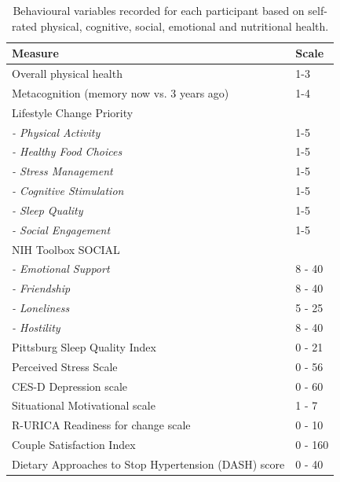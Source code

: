 \begin{table}[h]
\centering
\caption{Behavioural variables recorded for each participant based on self-rated physical, cognitive, social, emotional and nutritional health.}
\label{tbl: behavioural-variables}
\begin{tabular}{@{}ll@{}}
\toprule
Measure & Scale \\ \midrule
Overall physical health & 1-3 \\
Metacognition (memory now vs. 3 years ago) & 1-4 \\
Lifestyle Change Priority & \\
\textit{- Physical Activity} & 1-5 \\
\textit{- Healthy Food Choices} & 1-5 \\
\textit{- Stress Management} & 1-5 \\
\textit{- Cognitive Stimulation} & 1-5 \\
\textit{- Sleep Quality} & 1-5 \\
\textit{- Social Engagement} & 1-5 \\
NIH Toolbox SOCIAL &  \\
\textit{- Emotional Support} & 8 - 40 \\
\textit{- Friendship} & 8 - 40 \\
\textit{- Loneliness} & 5 - 25 \\
\textit{- Hostility} & 8 - 40 \\
Pittsburg Sleep Quality Index \cite{Buysse1989} & 0 - 21 \\
Perceived Stress Scale \cite{Cohen1983} & 0 - 56 \\
CES-D Depression scale \cite{Radloff1977} & 0 - 60 \\
Situational Motivational scale \cite{Guay2000} & 1 - 7 \\
R-URICA Readiness for change scale \cite{McConnaughy1983} & 0 - 10 \\
Couple Satisfaction Index \cite{Funk2007} & 0 - 160 \\
Dietary Approaches to Stop Hypertension (DASH) score \cite{Block1990} & 0 - 40 \\ \bottomrule
\end{tabular}
\end{table}

